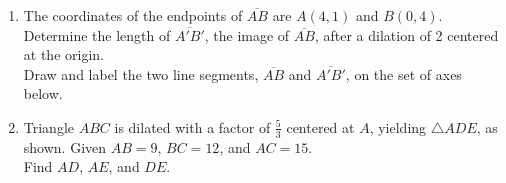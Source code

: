 \documentclass[12pt, twoside]{article}
\begin{document}
\begin{enumerate}
\newpage

\item The coordinates of the endpoints of $\overline{AB}$ are $A(4,1)$ and $B(0,4)$. Determine the length of $\overline{A'B'}$, the image of  $\overline{AB}$, after a dilation of 2 centered at the origin.\\[0.25cm]
Draw and label the two line segments,  $\overline{AB}$ and  $\overline{A'B'}$, on the set of axes below.
  \vspace{3cm}
  \begin{center}
  \end{center}

 \item Triangle $ABC$ is dilated with a factor of $\frac{5}{3}$ centered at $A$, yielding $\triangle ADE$, as shown. Given $AB=9$, $BC=12$, and $AC=15$. \\[0.25cm] Find $AD$, $AE$, and $DE$. \vspace{0.5cm}
 \begin{center}
   \end{center}

\end{enumerate}

\newpage
\end{document}
